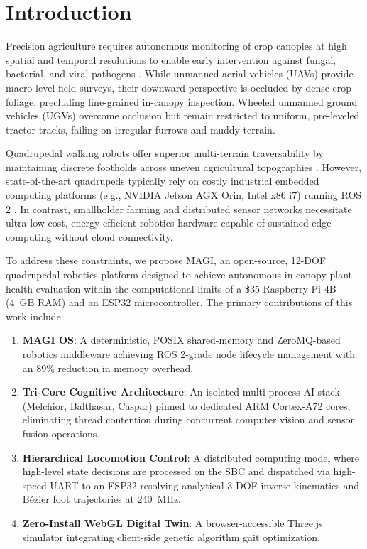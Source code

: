 \documentclass[conference]{IEEEtran}
\begin{document}
\section{Introduction}
Precision agriculture requires autonomous monitoring of crop canopies at high spatial and temporal resolutions to enable early intervention against fungal, bacterial, and viral pathogens \cite{bechar2016agricultural}. While unmanned aerial vehicles (UAVs) provide macro-level field surveys, their downward perspective is occluded by dense crop foliage, precluding fine-grained in-canopy inspection. Wheeled unmanned ground vehicles (UGVs) overcome occlusion but remain restricted to uniform, pre-leveled tractor tracks, failing on irregular furrows and muddy terrain.

Quadrupedal walking robots offer superior multi-terrain traversability by maintaining discrete footholds across uneven agricultural topographies \cite{hutter2016anymal}. However, state-of-the-art quadrupeds typically rely on costly industrial embedded computing platforms (e.g., NVIDIA Jetson AGX Orin, Intel x86 i7) running ROS 2 \cite{macenski2022robot}. In contrast, smallholder farming and distributed sensor networks necessitate ultra-low-cost, energy-efficient robotics hardware capable of sustained edge computing without cloud connectivity.

To address these constraints, we propose MAGI, an open-source, 12-DOF quadrupedal robotics platform designed to achieve autonomous in-canopy plant health evaluation within the computational limits of a \$35 Raspberry Pi 4B (4~GB RAM) and an ESP32 microcontroller. The primary contributions of this work include:
\begin{enumerate}
    \item \textbf{MAGI OS}: A deterministic, POSIX shared-memory and ZeroMQ-based robotics middleware achieving ROS 2-grade node lifecycle management with an 89\% reduction in memory overhead.
    \item \textbf{Tri-Core Cognitive Architecture}: An isolated multi-process AI stack (Melchior, Balthasar, Caspar) pinned to dedicated ARM Cortex-A72 cores, eliminating thread contention during concurrent computer vision and sensor fusion operations.
    \item \textbf{Hierarchical Locomotion Control}: A distributed computing model where high-level state decisions are processed on the SBC and dispatched via high-speed UART to an ESP32 resolving analytical 3-DOF inverse kinematics and Bézier foot trajectories at 240~MHz.
    \item \textbf{Zero-Install WebGL Digital Twin}: A browser-accessible Three.js simulator integrating client-side genetic algorithm gait optimization.
\end{enumerate}
\end{document}

